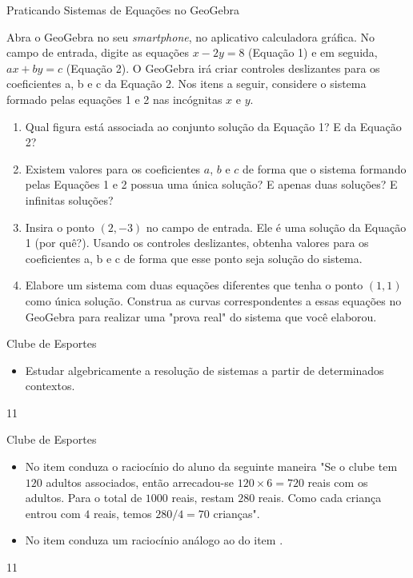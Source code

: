 \begin{task}{Praticando Sistemas de Equações no GeoGebra}

Abra o GeoGebra no seu \emph{smartphone}, no aplicativo calculadora gráfica. No campo de entrada, digite as equações $x - 2y = 8$ (Equação 1) e em seguida, $ax+ by = c$ (Equação 2). O GeoGebra irá criar controles deslizantes para os coeficientes a, b e c da Equação 2. Nos itens a seguir, considere o sistema formado pelas equações 1 e 2 nas incógnitas $x$ e $y$.

\begin{enumerate}
\item{} 
Qual figura está associada ao conjunto solução da Equação 1? E da Equação 2?

\item{}
Existem valores para os coeficientes $a$, $b$ e $c$ de forma que o sistema formando pelas Equações 1 e 2 possua uma única solução? E apenas duas soluções? E infinitas soluções?

\item{}
Insira o ponto $(2,-3)$ no campo de entrada. Ele é uma solução da Equação 1 (por quê?). Usando os controles deslizantes, obtenha valores para os coeficientes a, b e c de forma que esse ponto seja solução do sistema.

\item{}
Elabore um sistema com duas equações diferentes que tenha o ponto $(1, 1)$ como única solução. Construa as curvas correspondentes a essas equações no GeoGebra para realizar uma "prova real"{} do sistema que você elaborou.
\end{enumerate}

\end{task}
\cleardoublepage
\def\currentcolor{session1}
\begin{objectives}{Clube de Esportes}
{
\begin{itemize}
\item Estudar algebricamente a resolução de sistemas a partir de determinados contextos.
\end{itemize}
}{1}{1}
\end{objectives}
\begin{sugestions}{Clube de Esportes}
{
\begin{itemize}
\item No item  conduza o raciocínio do aluno da seguinte maneira "Se o clube tem $120$ adultos associados, então arrecadou-se $120 \times 6 = 720$ reais com os adultos. Para o total de $1000$ reais, restam $280$ reais. Como cada criança entrou com $4$ reais, temos $280/4=70$ crianças".
\item No item  conduza um raciocínio análogo ao do item .
\end{itemize}
}{1}{1}
\end{sugestions}
